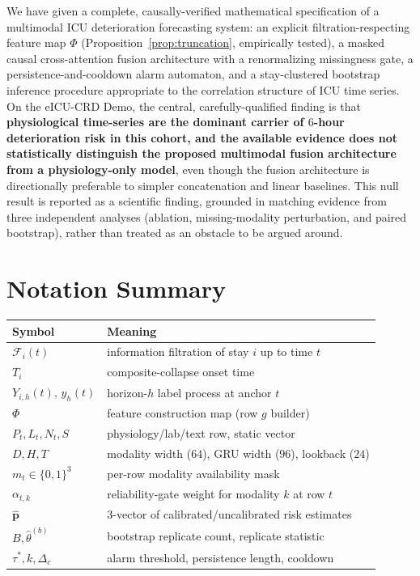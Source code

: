 \documentclass[11pt]{article}
\newcommand{\F}{\mathcal{F}}
\newcommand{\1}[1]{\mathbf{1}\!\left[#1\right]}
\begin{document}
We have given a complete, causally-verified mathematical specification of a multimodal ICU deterioration forecasting system: an explicit filtration-respecting feature map $\Phi$ (Proposition~\ref{prop:truncation}, empirically tested), a masked causal cross-attention fusion architecture with a renormalizing missingness gate, a persistence-and-cooldown alarm automaton, and a stay-clustered bootstrap inference procedure appropriate to the correlation structure of ICU time series. On the eICU-CRD Demo, the central, carefully-qualified finding is that \textbf{physiological time-series are the dominant carrier of $6$-hour deterioration risk in this cohort, and the available evidence does not statistically distinguish the proposed multimodal fusion architecture from a physiology-only model}, even though the fusion architecture is directionally preferable to simpler concatenation and linear baselines. This null result is reported as a scientific finding, grounded in matching evidence from three independent analyses (ablation, missing-modality perturbation, and paired bootstrap), rather than treated as an obstacle to be argued around.

\appendix
\section{Notation Summary}
\begin{table}[h]
\centering
\begin{tabular}{ll}
\toprule
Symbol & Meaning \\
\midrule
$\F_i(t)$ & information filtration of stay $i$ up to time $t$ \\
$T_i$ & composite-collapse onset time \\
$Y_{i,h}(t),\,y_h(t)$ & horizon-$h$ label process at anchor $t$ \\
$\Phi$ & feature construction map (row $g$ builder) \\
$P_t,L_t,N_t,S$ & physiology/lab/text row, static vector \\
$D,H,T$ & modality width ($64$), GRU width ($96$), lookback ($24$) \\
$m_t\in\{0,1\}^3$ & per-row modality availability mask \\
$\alpha_{t,k}$ & reliability-gate weight for modality $k$ at row $t$ \\
$\hat{\bm p}$ & $3$-vector of calibrated/uncalibrated risk estimates \\
$B,\hat\theta^{(b)}$ & bootstrap replicate count, replicate statistic \\
$\tau^\ast,k,\Delta_c$ & alarm threshold, persistence length, cooldown \\
\bottomrule
\end{tabular}
\end{table}
\end{document}
